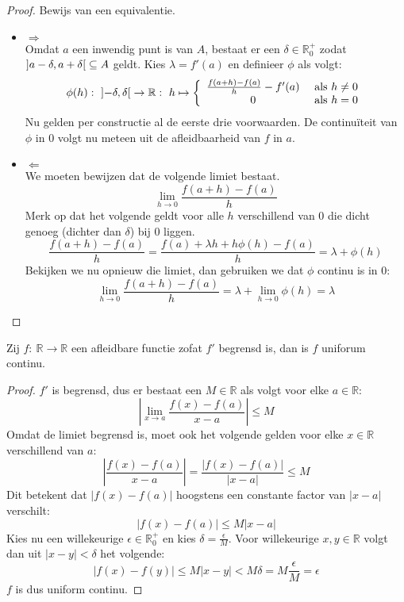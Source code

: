 \documentclass[main.tex]{subfiles}
\begin{document}
\begin{st}
  \begin{proof}
    Bewijs van een equivalentie.
    \begin{itemize}
    \item $\Rightarrow$\\
      Omdat $a$ een inwendig punt is van $A$, bestaat er een $\delta \in \mathbb{R}_{0}^{+}$ zodat $\interval[open]{a-\delta}{a+\delta}\subseteq A$ geldt.
      Kies $\lambda = f'(a)$ en definieer $\phi$ als volgt:
      \[ \phi(h):\ \interval[open]{-\delta}{\delta} \rightarrow \mathbb{R}:\ h \mapsto 
      \left\{
      \begin{array}{cl}
        \frac{f(a+h)-f(a)}{h}-f'(a) & \text{ als } h \neq 0\\
        0 & \text{ als } h = 0\\
      \end{array}
      \right.
      \]
      Nu gelden per constructie al de eerste drie voorwaarden.
      De continu\"iteit van $\phi$ in $0$ volgt nu meteen uit de afleidbaarheid van $f$ in $a$.
    \item $\Leftarrow$\\
      We moeten bewijzen dat de volgende limiet bestaat.
      \[ \lim_{h \rightarrow 0}\frac{f(a+h)-f(a)}{h} \]
      Merk op dat het volgende geldt voor alle $h$ verschillend van $0$ die dicht genoeg (dichter dan $\delta$) bij $0$ liggen. 
      \[ \frac{f(a+h)-f(a)}{h} = \frac{f(a) + \lambda h + h\phi(h)-f(a)}{h} = \lambda + \phi(h)\]
      Bekijken we nu opnieuw die limiet, dan gebruiken we dat $\phi$ continu is in $0$:
      \[ \lim_{h \rightarrow 0}\frac{f(a+h)-f(a)}{h} =\lambda + \lim_{h \rightarrow 0}\phi(h) = \lambda \]
    \end{itemize}
  \end{proof}
\end{st}

\begin{st}
  Zij $f:\ \mathbb{R} \rightarrow \mathbb{R}$ een afleidbare functie zofat $f'$ begrensd is, dan is $f$ uniforum continu.

  \begin{proof}
    $f'$ is begrensd, dus er bestaat een $M\in \mathbb{R}$ als volgt voor elke $a \in \mathbb{R}$:
    \[ \left|\lim_{x\rightarrow a}\frac{f(x)-f(a)}{x-a}\right| \le M\]
    Omdat de limiet begrensd is, moet ook het volgende gelden voor elke $x\in \mathbb{R}$ verschillend van $a$: 
    \[ \left|\frac{f(x)-f(a)}{x-a}\right| = \frac{|f(x)-f(a)|}{|x-a|} \le M \]
    Dit betekent dat $|f(x)-f(a)|$ hoogstens een constante factor van $|x-a|$ verschilt:
    \[ |f(x)-f(a)| \le M|x-a| \]
    Kies nu een willekeurige $\epsilon \in \mathbb{R}_{0}^{+}$ en kies $\delta = \frac{\epsilon}{M}$.
    Voor willekeurige $x,y \in \mathbb{R}$ volgt dan uit $|x-y|< \delta$ het volgende:
    \[ |f(x)-f(y)| \le M|x-y| < M\delta = M\frac{\epsilon}{M} = \epsilon \]
    $f$ is dus uniform continu.
\feed
  \end{proof}
\end{st}
\end{document}
